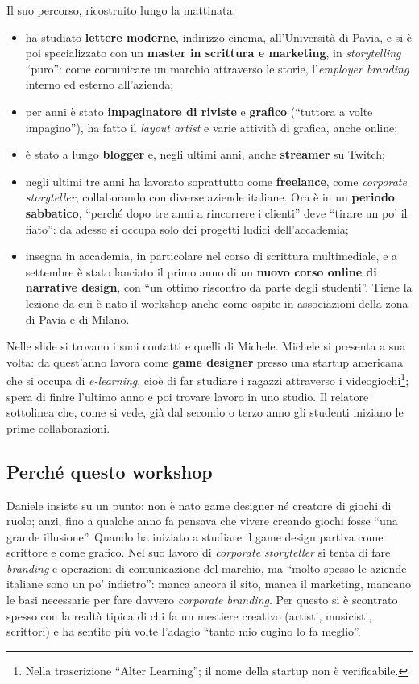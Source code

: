 Il suo percorso, ricostruito lungo la mattinata:
\begin{itemize}
  \item ha studiato \textbf{lettere moderne}, indirizzo cinema, all'Università
        di Pavia, e si è poi specializzato con un \textbf{master in scrittura e
        marketing}, in \emph{storytelling} ``puro'': come comunicare un marchio
        attraverso le storie, l'\emph{employer branding} interno ed esterno
        all'azienda;
  \item per anni è stato \textbf{impaginatore di riviste} e \textbf{grafico}
        (``tuttora a volte impagino''), ha fatto il \emph{layout artist} e varie
        attività di grafica, anche online;
  \item è stato a lungo \textbf{blogger} e, negli ultimi anni, anche
        \textbf{streamer} su Twitch;
  \item negli ultimi tre anni ha lavorato soprattutto come \textbf{freelance},
        come \emph{corporate storyteller}, collaborando con diverse aziende
        italiane. Ora è in un \textbf{periodo sabbatico}, ``perché dopo tre anni
        a rincorrere i clienti'' deve ``tirare un po' il fiato'': da adesso si
        occupa solo dei progetti ludici dell'accademia;
  \item insegna in accademia, in particolare nel corso di scrittura
        multimediale, e a settembre è stato lanciato il primo anno di un
        \textbf{nuovo corso online di narrative design}, con ``un ottimo
        riscontro da parte degli studenti''. Tiene la lezione da cui è nato il
        workshop anche come ospite in associazioni della zona di Pavia e di
        Milano.
\end{itemize}
Nelle slide si trovano i suoi contatti e quelli di Michele. Michele si
presenta a sua volta: da quest'anno lavora come \textbf{game designer} presso
una startup americana che si occupa di \emph{e-learning}, cioè di far studiare
i ragazzi attraverso i videogiochi\footnote{Nella trascrizione ``Alter
Learning''; il nome della startup non è verificabile.}; spera di finire l'ultimo
anno e poi trovare lavoro in uno studio. Il relatore sottolinea che, come si
vede, già dal secondo o terzo anno gli studenti iniziano le prime
collaborazioni.

\subsection{Perché questo workshop}

Daniele insiste su un punto: non è nato game designer né creatore di giochi di
ruolo; anzi, fino a qualche anno fa pensava che vivere creando giochi fosse
``una grande illusione''. Quando ha iniziato a studiare il game design partiva
come scrittore e come grafico. Nel suo lavoro di \emph{corporate storyteller}
si tenta di fare \emph{branding} e operazioni di comunicazione del marchio, ma
``molto spesso le aziende italiane sono un po' indietro'': manca ancora il
sito, manca il marketing, mancano le basi necessarie per fare davvero
\emph{corporate branding}. Per questo si è scontrato spesso con la realtà tipica
di chi fa un mestiere creativo (artisti, musicisti, scrittori) e ha sentito più
volte l'adagio ``tanto mio cugino lo fa meglio''.

